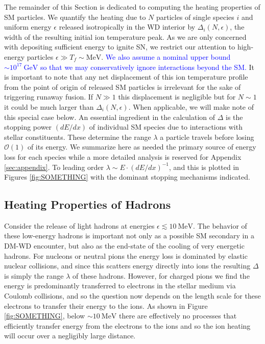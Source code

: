 \documentclass[twocolumn,showpacs,preprintnumbers,amsmath,amssymb,prd]{revtex4}
\newcommand{\OO}{\mathcal{O}}
\newcommand{\GeV}{\text{GeV}}
\newcommand{\MeV}{\text{MeV}}
\def\r{\right)}
\def\l{\left(}
\begin{document}
The remainder of this Section is dedicated to computing the heating properties of SM particles.
We quantify the heating due to $N$ particles of single species $i$ and uniform energy $\epsilon$ released isotropically in the WD interior by $\Delta_i(N, \epsilon)$, the width of the resulting initial ion temperature peak. 
As we are only concerned with depositing sufficient energy to ignite SN, we restrict our attention to high-energy particles $\epsilon \gg T_f \sim \text{MeV}$. 
\textcolor{blue}{We also assume a nominal upper bound $\sim 10^{17} ~\GeV$ so that we may conservatively ignore interactions beyond the SM.} 
It is important to note that any net displacement of this ion temperature profile from the point of origin of released SM particles is irrelevant for the sake of triggering runaway fusion. 
If $N \gg 1$ this displacement is negligible but for $N \sim 1$ it could be much larger than $\Delta_i(N,\epsilon)$. 
When applicable, we will make note of this special case below.
An essential ingredient in the calculation of $\Delta$ is the stopping power $(dE/dx)$ of individual SM species due to interactions with stellar constituents.  
These determine the range $\lambda$ a particle travels before losing $\OO(1)$ of its energy.
We summarize here as needed the primary source of energy loss for each species while a more detailed analysis is reserved for Appendix \ref{sec:appendix}. 
To leading order $\lambda \sim E \cdot \l dE/dx \r^{-1}$, and this is plotted in Figures \ref{fig:SOMETHING} with the dominant stopping mechanisms indicated. 


\subsection{Heating Properties of Hadrons}

Consider the release of light hadrons at energies $\epsilon \lesssim 10~\MeV$.
The behavior of these low-energy hadrons is important not only as a possible SM secondary in a DM-WD encounter, but also as the end-state of the cooling of very energetic hadrons. 
For nucleons or neutral pions the energy loss is dominated by elastic nuclear collisions, and since this scatters energy directly into ions the resulting $\Delta$ is simply the range $\lambda$ of these hadrons.
However, for charged pions we find the energy is predominantly transferred to electrons in the stellar medium via Coulomb collisions, and so the question now depends on the length scale for these electrons to transfer their energy to the ions. 
As shown in Figure \ref{fig:SOMETHING}, below $\sim 10~\MeV$ there are effectively no processes that efficiently transfer energy from the electrons to the ions and so the ion heating will occur over a negligibly large distance. 
\end{document}

